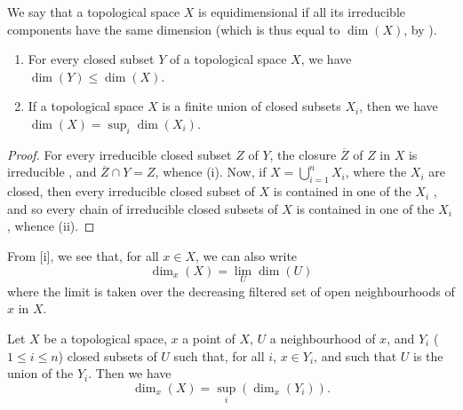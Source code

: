 \begin{defn}[14.1.3]
\label{0.14.1.3}
We say that a topological space $X$ is equidimensional if all its irreducible components have the same dimension (which is thus equal to $\dim(X)$, by ).
\end{defn}

\begin{prop}[14.1.4]
\label{0.14.1.4}
\medskip\noindent
\begin{enumerate}[label=\emph{(\roman*)}]
    \item For every closed subset $Y$ of a topological space $X$, we have $\dim(Y)\leq\dim(X)$.
    \item If a topological space $X$ is a finite union of closed subsets $X_i$, then we have $\dim(X)=\sup_i\dim(X_i)$.
\end{enumerate}
\end{prop}

\begin{proof}
\label{proof-0.14.1.4}
For every irreducible closed subset $Z$ of $Y$, the closure $\overline{Z}$ of $Z$ in $X$ is irreducible , and $\overline{Z}\cap Y=Z$, whence (i).
Now, if $X=\bigcup_{i=1}^nX_i$, where the $X_i$ are closed, then every irreducible closed subset of $X$ is contained in one of the $X_i$ , and so every chain of irreducible closed subsets of $X$ is contained in one of the $X_i$, whence (ii).
\end{proof}

From [i], we see that, for all $x\in X$, we can also write
\begin{equation*}
\label{0.14.1.4.1}
    \dim_x(X) = \lim_U\dim(U)\tag{14.1.4.1}
\end{equation*}
where the limit is taken over the decreasing filtered set of open neighbourhoods of $x$ in $X$.


\begin{cor}[14.1.5]
\label{0.14.1.5}
Let $X$ be a topological space, $x$ a point of $X$, $U$ a neighbourhood of $x$, and $Y_i$ ($1\leq i\leq n$) closed subsets of $U$ such that, for all $i$, $x\in Y_i$, and such that $U$ is the union of the $Y_i$.
Then we have
\begin{equation*}
\label{0.14.1.5.1}
    \dim_x(X) = \sup_i(\dim_x(Y_i)).\tag{14.1.5.1}
\end{equation*}
\end{cor}

